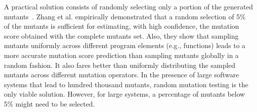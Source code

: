 A practical solution consists of  randomly selecting only a portion of the generated mutants~\cite{zhang2010operator,gopinath2015hard,zhang2013operator}. 
%
%
% 
Zhang et al. \cite{zhang2013operator} empirically demonstrated that a random selection of 5\% of the mutants is sufficient for 
estimating, with high confidence, the mutation score obtained with the complete mutants set.
Also,
they show that sampling mutants uniformly across different program elements (e.g., functions) %
leads to a more accurate mutation score prediction than sampling mutants globally in a random fashion. It also fares better than uniformly distributing the sampled mutants across different mutation operators. In the presence of large software systems that lead to hundred thousand mutants, random mutation testing is the only viable solution. However, for large systems, a percentage of mutants below 5\% might need to be selected.

